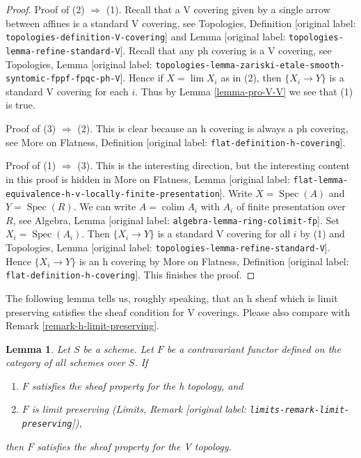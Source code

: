 \documentclass[10pt,a4paper]{article}
\theoremstyle{plain}
\newtheorem{lemma}[subsection]{Lemma}
\theoremstyle{definition}
\theoremstyle{remark}
\numberwithin{equation}{subsection}
\def\lim{\mathop{\mathrm{lim}}\nolimits}
\def\colim{\mathop{\mathrm{colim}}\nolimits}
\def\Spec{\mathop{\mathrm{Spec}}}
\begin{document}
\begin{proof}
Proof of (2) $\Rightarrow$ (1). Recall that a V covering given by a
single arrow between affines is a standard V covering, see
Topologies, Definition \textnormal{[original label: \nolinkurl{topologies-definition-V-covering}]} and
Lemma \textnormal{[original label: \nolinkurl{topologies-lemma-refine-standard-V}]}.
Recall that any ph covering is a V covering, see
Topologies, Lemma
\textnormal{[original label: \nolinkurl{topologies-lemma-zariski-etale-smooth-syntomic-fppf-fpqc-ph-V}]}.
Hence if $X = \lim X_i$ as in (2), then $\{X_i \to Y\}$
is a standard V covering for each $i$. Thus by
Lemma \ref{lemma-pro-V-V} we see that (1) is true.

\medskip\noindent
Proof of (3) $\Rightarrow$ (2). This is clear because an h covering
is always a ph covering, see
More on Flatness, Definition \textnormal{[original label: \nolinkurl{flat-definition-h-covering}]}.

\medskip\noindent
Proof of (1) $\Rightarrow$ (3). This is the interesting direction, but
the interesting content in this proof is hidden in More on Flatness, Lemma
\textnormal{[original label: \nolinkurl{flat-lemma-equivalence-h-v-locally-finite-presentation}]}.
Write $X = \Spec(A)$ and $Y = \Spec(R)$. We can write
$A = \colim A_i$ with $A_i$ of finite presentation over $R$, see
Algebra, Lemma \textnormal{[original label: \nolinkurl{algebra-lemma-ring-colimit-fp}]}.
Set $X_i = \Spec(A_i)$. Then $\{X_i \to Y\}$ is a standard V covering
for all $i$ by (1) and
Topologies, Lemma \textnormal{[original label: \nolinkurl{topologies-lemma-refine-standard-V}]}.
Hence $\{X_i \to Y\}$ is an h covering by
More on Flatness, Definition \textnormal{[original label: \nolinkurl{flat-definition-h-covering}]}.
This finishes the proof.
\end{proof}

\noindent
The following lemma tells us, roughly speaking, that an h sheaf
which is limit preserving satisfies the sheaf condition for V coverings.
Please also compare with Remark \ref{remark-h-limit-preserving}.

\begin{lemma}
\label{lemma-h-limit-preserving}
Let $S$ be a scheme. Let $F$ be a contravariant functor defined
on the category of all schemes over $S$. If
\begin{enumerate}
\item $F$ satisfies the sheaf property for the h topology, and
\item $F$ is limit preserving
(Limits, Remark \textnormal{[original label: \nolinkurl{limits-remark-limit-preserving}]}),
\end{enumerate}
then $F$ satisfies the sheaf property for the V topology.
\end{lemma}
\end{document}
